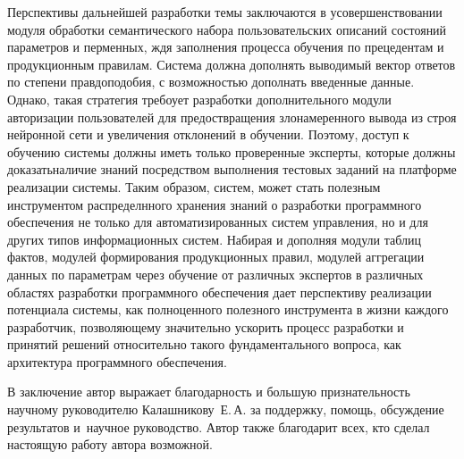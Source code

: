 Перспективы дальнейшей разработки темы заключаются в усовершенствовании модуля обработки семантического набора пользовательских описаний состояний параметров и перменных, ждя заполнения процесса обучения по прецедентам и продукционным правилам. Система должна дополнять выводимый вектор ответов по степени правдоподобия,  с возможностью дополнать введенные данные. Однако, такая стратегия требоует разработки дополнительного модули авторизации пользователей для предоствращения злонамеренного вывода из строя нейронной сети и увеличения отклонений в обучении. Поэтому, доступ к обучению системы должны иметь только проверенные эксперты, которые должны доказатьналичие знаний посредством выполнения тестовых заданий на платформе реализации системы. Таким образом, систем, может стать полезным инструментом распределнного хранения знаний о разработки программного обеспечения не только для автоматизированных систем управления, но и для других типов информационных систем. Набирая и дополняя модули таблиц фактов, модулей формирования продукционных правил, модулей аггрегации данных по параметрам через обучение от различных экспертов в различных областях разработки программного обеспечения дает перспективу реализации потенциала системы, как полноценного полезного инструмента в жизни каждого разработчик, позволяющему значительно ускорить процесс разработки и принятий решений относительно такого фундаментального вопроса, как архитектура программного обеспечения.

В заключение автор выражает благодарность и большую признательность научному руководителю
Калашникову~Е.\,А. за поддержку, помощь, обсуждение результатов и~научное
руководство. Автор также благодарит всех, кто сделал настоящую работу автора возможной.
